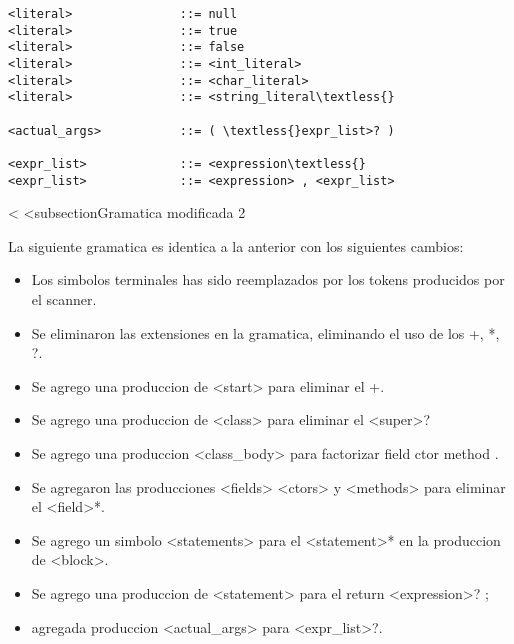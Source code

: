 \documentclass [a4paper,titlepage]{report}
\begin{document}
\begin{verbatim}
<literal>               ::= null
<literal>               ::= true
<literal>               ::= false
<literal>               ::= <int_literal>
<literal>               ::= <char_literal>
<literal>               ::= <string_literal\textless{}

<actual_args>           ::= ( \textless{}expr_list>? )

<expr_list>             ::= <expression\textless{}
<expr_list>             ::= <expression> , <expr_list>
\end{verbatim}\textless{}
\textless{}subsection{Gramatica modificada 2}

La siguiente gramatica es identica a la anterior con los siguientes 
cambios:

\begin{itemize}

\item Los simbolos terminales has sido reemplazados por los tokens 
producidos por el scanner.

\item Se eliminaron las extensiones en la gramatica, eliminando el 
uso de los +, *, ?.

\item Se agrego una produccion de \textless{}start\textgreater{} para 
eliminar el +.

\item Se agrego una produccion de \textless{}class\textgreater{} para 
eliminar el \textless{}super\textgreater{}?

\item Se agrego una produccion \textless{}class\_body\textgreater{} 
para factorizar { field ctor method }.

\item Se agregaron las producciones \textless{}fields\textgreater{} 
\textless{}ctors\textgreater{} y \textless{}methods\textgreater{} 
para eliminar el \textless{}field\textgreater{}*.

\item Se agrego un simbolo \textless{}statements\textgreater{} 
para el \textless{}statement\textgreater{}* en la produccion de 
\textless{}block\textgreater{}.

\item Se agrego una produccion de \textless{}statement\textgreater{} 
para el return \textless{}expression\textgreater{}? ;

\item agregada produccion \textless{}actual\_args\textgreater{} para 
\textless{}expr\_list\textgreater{}?.

\end{itemize}
\end{document}
